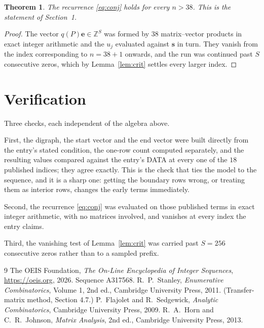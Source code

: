 \documentclass[11pt,a4paper]{article}
\theoremstyle{plain}
\newtheorem{theorem}{Theorem}
\theoremstyle{definition}
\begin{document}
\begin{theorem}
The recurrence \eqref{eq:conj} holds for every $n>38$. This is the statement of
Section~1.
\end{theorem}

\begin{proof}
The vector $q(P)\mathbf{e}\in\mathbb{Z}^{S}$ was formed by $38$ matrix--vector
products in exact integer arithmetic and the $u_j$ evaluated against $\mathbf{s}$ in turn.
They vanish from the index corresponding to $n=38+1$ onwards, and the run was continued
past $S$ consecutive zeros, which by Lemma~\ref{lem:crit} settles every larger index.
\end{proof}

\section{Verification}

Three checks, each independent of the algebra above.

First, the digraph, the start vector and the end vector were built directly from the
entry's stated condition, the one-row count computed separately, and the resulting values
compared against the entry's DATA at every one of the $18$ published indices; they
agree exactly. This is the check that ties the model to the sequence, and it is a sharp one:
getting the boundary rows wrong, or treating them as interior rows, changes the early terms
immediately.

Second, the recurrence \eqref{eq:conj} was evaluated on those published terms in exact
integer arithmetic, with no matrices involved, and vanishes at every index the entry claims.

Third, the vanishing test of Lemma~\ref{lem:crit} was carried past $S=256$ consecutive
zeros rather than to a sampled prefix.

\begin{thebibliography}{9}
 The OEIS Foundation, \emph{The On-Line Encyclopedia of Integer
Sequences}, \url{https://oeis.org}, 2026. Sequence A317568.
 R.~P.~Stanley, \emph{Enumerative Combinatorics}, Volume 1, 2nd ed.,
Cambridge University Press, 2011. (Transfer-matrix method, Section 4.7.)
 P.~Flajolet and R.~Sedgewick, \emph{Analytic Combinatorics}, Cambridge
University Press, 2009.
 R.~A.~Horn and C.~R.~Johnson, \emph{Matrix Analysis}, 2nd ed., Cambridge
University Press, 2013.
\end{thebibliography}
\end{document}

